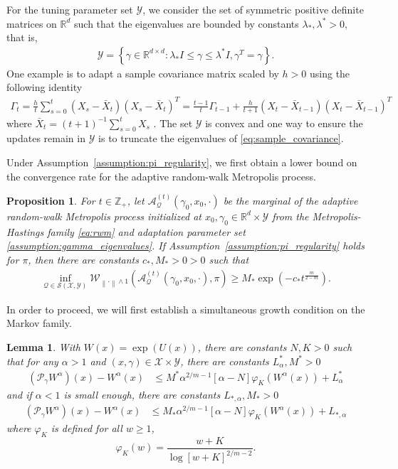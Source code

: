\documentclass[12pt]{article}
\theoremstyle{plain}
\newtheorem{proposition}[theorem]{Proposition}
\newtheorem{lemma}[theorem]{Lemma}
\theoremstyle{remark}
\newcommand{\norm}[1]{\left\lVert#1\right\rVert}
\newcommand{\R}{\mathbb{R}}
\newcommand{\Z}{\mathbb{Z}}
\newcommand{\Q}{\mathcal{Q}}
\renewcommand{\P}{\mathcal{P}}
\newcommand{\W}{\mathcal{W}}
\newcommand{\A}{\mathcal{A}}
\newcommand{\X}{\mathcal{X}}
\newcommand{\Y}{\mathcal{Y}}
\renewcommand{\S}{\mathcal{S}}
\let\temp\phi
\let\phi\varphi
\let\varphi\temp
\newcommand{\eq}[1]{\begin{align*}#1\end{align*}}
\begin{document}
For the tuning parameter set $\Y$, we consider the set of symmetric positive definite matrices on $\R^d$ such that the eigenvalues are bounded by constants $\lambda_*, \lambda^* > 0$, that is,
\begin{align}
\Y
= \left\{ 
\gamma \in \R^{d \times d} : 
\lambda_* I
\le \gamma
\le \lambda^* I, \gamma^T = \gamma
\label{assumption:gamma_eigenvalues}
\right\}.
\end{align}
One example is to adapt a sample covariance matrix scaled by $h > 0$ using the following identity
\begin{align}
\Gamma_{t}
= \frac{h}{t} \sum_{s = 0}^{t} (X_s - \bar{X}_{t}) (X_s - \bar{X}_{t})^T
= \frac{t - 1}{t} \Gamma_{t-1} + \frac{h}{t + 1} (X_{t} - \bar{X}_{t-1}) (X_{t} - \bar{X}_{t-1})^T
\label{eq:sample_covariance}
\end{align}
where $\bar{X}_{t} = (t+1)^{-1} \sum_{s = 0}^{t} X_{s}$ \citep{haario:2001, andrieu:moulines:2006}.
The set $\Y$ is convex and one way to ensure the updates remain in $\Y$ is to truncate the eigenvalues of \eqref{eq:sample_covariance}.

Under Assumption~\eqref{assumption:pi_regularity}, we first obtain a lower bound on the convergence rate for the adaptive random-walk Metropolis process.

\begin{proposition}
\label{proposition:adaptive_rwm_result}
For $t \in \Z_+$, let $\A_{\Q}^{(t)}(\gamma_0, x_0, \cdot)$ be the marginal of the adaptive random-walk Metropolis process initialized at $x_0, \gamma_0 \in \R^d \times \Y$ from the Metropolis-Hastings family \eqref{eq:rwm} and adaptation parameter set \eqref{assumption:gamma_eigenvalues}.
If Assumption~\eqref{assumption:pi_regularity} holds for $\pi$, then there are constants $c_*, M_* > 0  > 0$ such that
\eq{
\inf_{\Q \in \S(\X, \Y) } \W_{\norm{\cdot} \wedge 1}\left( \A_{\Q}^{(t)}(\gamma_0, x_0, \cdot), \pi \right)
\ge M_* \exp\left( -c_* {t}^{\frac{m}{2-m}}\right).
}
\end{proposition}

\noindent In order to proceed, we will first establish a simultaneous growth condition on the Markov family.

\begin{lemma}
\label{lemma:adaptive_rwm_lyap}
With $W(x) = \exp(U(x))$, there are constants $N, K > 0$ such that for any $\alpha > 1$ and $(x, \gamma) \in \X \times \Y$, there are constants $L^*_\alpha, M^* > 0$
\begin{align*}
(\P_\gamma W^\alpha)(x) - W^\alpha(x)
&\le M^* \alpha^{ 2/m - 1 } \left[ \alpha - N \right] \phi_K( W^\alpha(x) )
+ L^*_{\alpha}
\end{align*}
and if $\alpha < 1$ is small enough, there are constants $L_{*, \alpha}, M_* > 0$
\begin{align*}
(\P_\gamma W^\alpha)(x) - W^\alpha(x)
&\le M_* \alpha^{ 2/m - 1 } \left[ \alpha - N \right] \phi_K( W^\alpha(x) )
+ L_{*, \alpha}
\end{align*}
where $\phi_{K}$ is defined for all $w \ge 1$,
\[
\phi_{K}(w) = \frac{w + K}{ \log\left[ w + K \right]^{ 2/m - 2 } }.
\]
\end{lemma}
\end{document}
